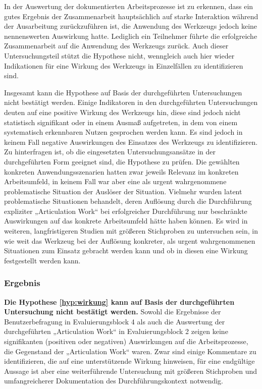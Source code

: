In der Auswertung der dokumentierten Arbeitsprozesse ist zu erkennen, dass ein gutes Ergebnis der Zusammenarbeit hauptsächlich auf starke Interaktion während der Ausarbeitung zurückzuführen ist, die Anwendung des Werkzeugs jedoch keine nennenswerten Auswirkung hatte. Lediglich ein Teilnehmer führte die erfolgreiche Zusammenarbeit auf die Anwendung des Werkzeugs zurück. Auch dieser Untersuchungsteil stützt die Hypothese nicht, wenngleich auch hier wieder Indikationen für eine Wirkung des Werkzeugs in Einzelfällen zu identifizieren sind.

Insgesamt kann die Hypothese auf Basis der durchgeführten Untersuchungen nicht bestätigt werden. Einige Indikatoren in den durchgeführten Untersuchungen deuten auf eine positive Wirkung des Werkzeugs hin, diese sind jedoch nicht statistisch signifikant oder in einem Ausmaß aufgetreten, in dem von einem systematisch erkennbaren Nutzen gesprochen werden kann. Es sind jedoch in keinem Fall negative Auswirkungen des Einsatzes des Werkzeugs zu identifizieren. Zu hinterfragen ist, ob die eingesetzten Untersuchungsansätze in der durchgeführten Form geeignet sind, die Hypothese zu prüfen. Die gewählten konkreten Anwendungsszenarien hatten zwar jeweils Relevanz im konkreten Arbeitsumfeld, in keinem Fall war aber eine als urgent wahrgenommene problematische Situation der Auslöser der Situation. Vielmehr wurden latent problematische Situationen behandelt, deren Auflösung durch die Durchführung expliziter „Articulation Work“ bei erfolgreicher Durchführung nur beschränkte Auswirkungen auf das konkrete Arbeitsumfeld hätte haben können. Es wird in weiteren, langfristigeren Studien mit größeren Stichproben zu untersuchen sein, in wie weit das Werkzeug bei der Auflösung konkreter, als urgent wahrgenommenen Situationen zum Einsatz gebracht werden kann und ob in diesen eine Wirkung festgestellt werden kann. 

\subsubsection{Ergebnis} 

\textbf{Die Hypothese \ref{hyp:wirkung} kann auf Basis der durchgeführten Untersuchung nicht bestätigt werden.} Sowohl die Ergebnisse der Benutzerbefragung in Evaluierungsblock 4 als auch die Auswertung der durchgeführten „Articulation Work“ in Evaluierungsblock 2 zeigen keine signifikanten (positiven oder negativen) Auswirkungen auf die Arbeitsprozesse, die Gegenstand der „Articulation Work“ waren. Zwar sind einige Kommentare zu identifizieren, die auf eine unterstützende Wirkung hinweisen, für eine endgültige Aussage ist aber eine weiterführende Untersuchung mit größeren Stichproben und umfangreicherer Dokumentation des Durchführungskontext notwendig. 

